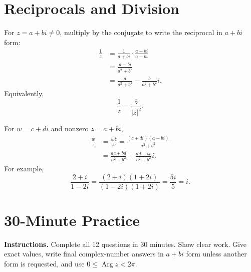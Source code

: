 \documentclass[12pt]{article}
\begin{document}
\section*{Reciprocals and Division}
For $z=a+bi\ne0$, multiply by the conjugate to write the reciprocal in $a+bi$ form:
\[
\begin{aligned}
  \frac1z
  &=\frac1{a+bi}\cdot\frac{a-bi}{a-bi}\\
  &=\frac{a-bi}{a^2+b^2}\\
  &=\boxed{\frac{a}{a^2+b^2}-\frac{b}{a^2+b^2}i}.
\end{aligned}
\]
Equivalently,
\[
  \frac1z=\frac{\overline z}{|z|^2}.
\]

For $w=c+di$ and nonzero $z=a+bi$,
\[
\begin{aligned}
  \frac wz
  &=\frac{w\overline z}{z\overline z}
  =\frac{(c+di)(a-bi)}{a^2+b^2}\\
  &=\boxed{\frac{ac+bd}{a^2+b^2}
  +\frac{ad-bc}{a^2+b^2}i}.
\end{aligned}
\]
For example,
\[
  \frac{2+i}{1-2i}
  =\frac{(2+i)(1+2i)}{(1-2i)(1+2i)}
  =\frac{5i}{5}=i.
\]

\clearpage
\section*{30-Minute Practice}
\textbf{Instructions.} Complete all 12 questions in 30 minutes. Show clear work. Give exact values, write final complex-number answers in $a+bi$ form unless another form is requested, and use $0\le\operatorname{Arg}z<2\pi$.
\end{document}
